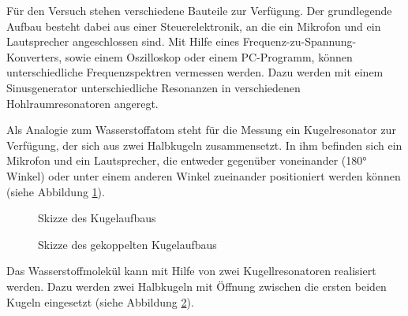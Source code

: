Für den Versuch stehen verschiedene Bauteile zur Verfügung. Der grundlegende Aufbau besteht dabei aus einer Steuerelektronik,
an die ein Mikrofon und ein Lautsprecher angeschlossen sind. Mit Hilfe eines Frequenz-zu-Spannung-Konverters, sowie einem
Oszilloskop oder einem PC-Programm, können unterschiedliche Frequenzspektren vermessen werden. Dazu werden mit einem
Sinusgenerator unterschiedliche Resonanzen in verschiedenen Hohlraumresonatoren angeregt.

Als Analogie zum Wasserstoffatom steht für die Messung ein Kugelresonator zur Verfügung, der sich aus zwei Halbkugeln
zusammensetzt. In ihm befinden sich ein Mikrofon und ein Lautsprecher, die entweder gegenüber voneinander (180° Winkel)
oder unter einem anderen Winkel zueinander positioniert werden können (siehe Abbildung \ref{fig:aufbau_kugel}).

\begin{figure}[H]
  \centering
  \caption{Skizze des Kugelaufbaus}
  \label{fig:aufbau_kugel}
\end{figure}

\begin{figure}[H]
  \centering
  \caption{Skizze des gekoppelten Kugelaufbaus}
  \label{fig:aufbau_kugel_2}
\end{figure}

Das Wasserstoffmolekül kann mit Hilfe von zwei Kugellresonatoren realisiert werden. Dazu werden zwei Halbkugeln mit Öffnung
zwischen die ersten beiden Kugeln eingesetzt (siehe Abbildung \ref{fig:aufbau_kugel_2}).

